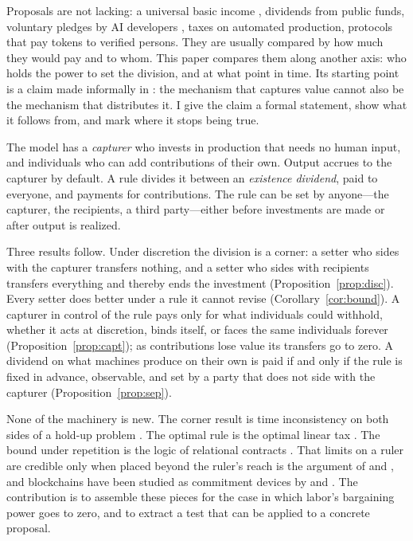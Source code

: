 Proposals are not lacking: a universal basic income \citep{VanParijs2017}, dividends from
public funds, voluntary pledges by AI developers \citep{OKeefe2020}, taxes on automated
production, protocols that pay tokens to verified persons. They are usually compared by
how much they would pay and to whom. This paper compares them along another axis: who
holds the power to set the division, and at what point in time. Its starting point is a
claim made informally in \citet{Titan2026}: the mechanism that captures value cannot also
be the mechanism that distributes it. I give the claim a formal statement, show what it
follows from, and mark where it stops being true.

The model has a \emph{capturer} who invests in production that needs no human input, and
individuals who can add contributions of their own. Output accrues to the capturer by
default. A rule divides it between an \emph{existence dividend}, paid to everyone, and
payments for contributions. The rule can be set by anyone---the capturer, the recipients, a
third party---either before investments are made or after output is realized.

Three results follow. Under discretion the division is a corner: a setter who sides with
the capturer transfers nothing, and a setter who sides with recipients transfers everything
and thereby ends the investment (Proposition~\ref{prop:disc}). Every setter does better
under a rule it cannot revise (Corollary~\ref{cor:bound}). A capturer in control of the
rule pays only for what individuals could withhold, whether it acts at discretion, binds
itself, or faces the same individuals forever (Proposition~\ref{prop:capt}); as
contributions lose value its transfers go to zero. A dividend on what machines produce on
their own is paid if and only if the rule is fixed in advance, observable, and set by a
party that does not side with the capturer (Proposition~\ref{prop:sep}).

None of the machinery is new. The corner result is time inconsistency
\citep{KydlandPrescott1977,Fischer1980} on both sides of a hold-up problem
\citep{KleinCrawfordAlchian1978,GrossmanHart1986}. The optimal rule is the optimal linear
tax \citep{Sheshinski1972,SaezStantcheva2016}. The bound under repetition is the logic of
relational contracts \citep{MacLeodMalcomson1989,Levin2003}. That limits on a ruler are
credible only when placed beyond the ruler's reach is the argument of
\citet{NorthWeingast1989} and \citet{AcemogluRobinson2000}, and blockchains have been
studied as commitment devices by \citet{CongHe2019} and \citet{HoldenMalani2019}. The
contribution is to assemble these pieces for the case in which labor's bargaining power
goes to zero, and to extract a test that can be applied to a concrete proposal.

